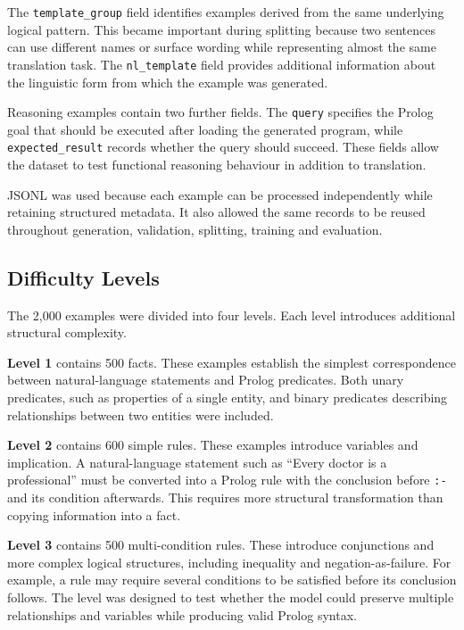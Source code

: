 \documentclass[11pt]{article} %
\theoremstyle{plain}
\theoremstyle{definition}
\begin{document}
The \texttt{template\_group} field identifies examples derived from the same
underlying logical pattern. This became important during splitting because two
sentences can use different names or surface wording while representing almost
the same translation task. The \texttt{nl\_template} field provides additional
information about the linguistic form from which the example was generated.

Reasoning examples contain two further fields. The \texttt{query} specifies the
Prolog goal that should be executed after loading the generated program, while
\texttt{expected\_result} records whether the query should succeed. These fields
allow the dataset to test functional reasoning behaviour in addition to
translation.

JSONL was used because each example can be processed independently while
retaining structured metadata. It also allowed the same records to be reused
throughout generation, validation, splitting, training and evaluation.

\subsection{Difficulty Levels}

The 2,000 examples were divided into four levels. Each level introduces
additional structural complexity.

\textbf{Level 1} contains 500 facts. These examples establish the simplest
correspondence between natural-language statements and Prolog predicates. Both
unary predicates, such as properties of a single entity, and binary predicates
describing relationships between two entities were included.

\textbf{Level 2} contains 600 simple rules. These examples introduce variables
and implication. A natural-language statement such as ``Every doctor is a
professional'' must be converted into a Prolog rule with the conclusion before
\texttt{:-} and its condition afterwards. This requires more structural
transformation than copying information into a fact.

\textbf{Level 3} contains 500 multi-condition rules. These introduce
conjunctions and more complex logical structures, including inequality and
negation-as-failure. For example, a rule may require several conditions to be
satisfied before its conclusion follows. The level was designed to test whether
the model could preserve multiple relationships and variables while producing
valid Prolog syntax.
\end{document}
